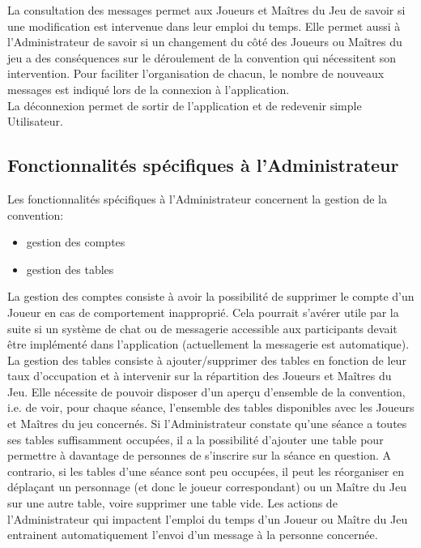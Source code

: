 \documentclass[11pt]{article}
\begin{document}
La consultation des messages permet aux Joueurs et Maîtres du Jeu de savoir si une modification est intervenue dans leur emploi du temps. Elle permet aussi à l'Administrateur de savoir si un changement du côté des Joueurs ou Maîtres du jeu a des conséquences sur le déroulement de la convention qui nécessitent son intervention. Pour faciliter l'organisation de chacun, le nombre de nouveaux messages est indiqué lors de la connexion à l'application.\\

La déconnexion permet de sortir de l'application et de redevenir simple Utilisateur.



\subsection{Fonctionnalités spécifiques à l'Administrateur} 

Les fonctionnalités spécifiques à l'Administrateur concernent la gestion de la convention:
\begin{itemize}
\item{gestion des comptes}
\item{gestion des tables\\}
\end{itemize}

La gestion des comptes consiste à avoir la possibilité de supprimer le compte d'un Joueur en cas de comportement inapproprié. Cela pourrait s'avérer utile par la suite si un système de chat ou de messagerie accessible aux participants devait être implémenté dans l'application (actuellement la messagerie est automatique).\\

La gestion des tables consiste à ajouter/supprimer des tables en fonction de leur taux d'occupation et à intervenir sur la répartition des Joueurs et Maîtres du Jeu. Elle nécessite de pouvoir disposer d'un aperçu d'ensemble de la convention, i.e. de voir, pour chaque séance, l'ensemble des tables disponibles avec les Joueurs et Maîtres du jeu concernés. Si l'Administrateur constate qu'une séance a toutes ses tables suffisamment occupées, il a la possibilité d'ajouter une table pour permettre à davantage de personnes de s'inscrire sur la séance en question. A contrario, si les tables d'une séance sont peu occupées, il peut les réorganiser en déplaçant un personnage (et donc le joueur correspondant) ou un Maître du Jeu sur une autre table, voire supprimer une table vide. Les actions de l'Administrateur qui impactent l'emploi du temps d'un Joueur ou Maître du Jeu entrainent automatiquement l'envoi d'un message à la personne concernée.\\
\end{document}
